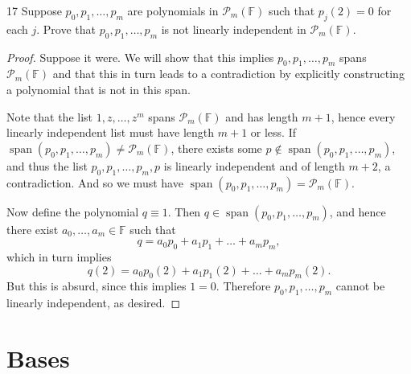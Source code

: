 \documentclass{extarticle}
\newenvironment{problem}[1]{\begin{prob*}{#1}{}}{\end{prob*}}
\newcommand{\F}{\mathbb{F}}
\DeclareMathOperator{\Span}{span}
\begin{document}
\begin{problem}{17}
Suppose $p_0, p_1,\dots, p_m$ are polynomials in $\mathcal{P}_m(\F)$ such that $p_j(2)=0$ for each $j$.  Prove that $p_0,p_1,\dots,p_m$ is not linearly independent in $\mathcal{P}_m(\F)$.
\end{problem}
\begin{proof}
Suppose it were.  We will show that this implies $p_0, p_1,\dots, p_m$ spans $\mathcal{P}_m(\F)$ and that this in turn leads to a contradiction by explicitly constructing a polynomial that is not in this span.
\par Note that the list $1,z,\dots, z^m$ spans $\mathcal{P}_m(\F)$ and has length $m+1$, hence every linearly independent list must have length $m+1$ or less.  If $\Span(p_0, p_1,\dots, p_m)\neq \mathcal{P}_m(\F)$, there exists some $p\not\in\Span(p_0,p_1,\dots, p_m)$, and thus the list $p_0,p_1, \dots,p_m, p$ is linearly independent and of length $m+2$, a contradiction.  And so we must have $\Span(p_0,p_1,\dots,p_m) = \mathcal{P}_m(\F)$.
\par Now define the polynomial $q\equiv 1$.  Then $q\in\Span(p_0, p_1,\dots, p_m)$, and hence there exist $a_0,\dots, a_m\in\F$ such that 
\begin{equation*}
q = a_0p_0+a_1p_1 + \dots + a_mp_m,
\end{equation*}
which in turn implies 
\begin{equation*}
q(2) = a_0p_0(2)+a_1p_1(2) + \dots + a_mp_m(2).
\end{equation*}
But this is absurd, since this implies $1 = 0$.  Therefore $p_0,p_1,\dots,p_m$ cannot be linearly independent, as desired.
\end{proof}


\section{Bases}
\end{document}
